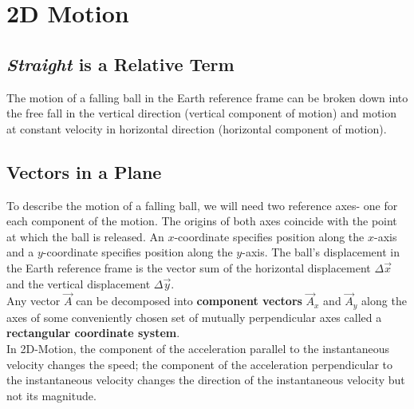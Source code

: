 \section{2D Motion}

    \subsection{\textit{Straight} is a Relative Term}

        The motion of a falling ball in the Earth reference frame can be broken down into the free fall in the vertical direction (vertical component of motion) and motion at constant velocity in horizontal direction
        (horizontal component of motion).


    \subsection{Vectors in a Plane}

        To describe the motion of a falling ball, we will need two reference axes- one for each component of the motion. The origins of both axes coincide with the point at which the ball is released. An $x$-coordinate
        specifies position along the $x$-axis and a $y$-coordinate specifies position along the $y$-axis. The ball's displacement in the Earth reference frame is the vector sum of the horizontal displacement
        $\Delta \vec{x}$ and the vertical displacement $\Delta \vec{y}$. \\

        Any vector $\vec{A}$ can be decomposed into \textbf{component vectors} $\vec{A}_x$ and $\vec{A}_y$ along the axes of some conveniently chosen set of mutually perpendicular axes called a
        \textbf{rectangular coordinate system}. \\

        In 2D-Motion, the component of the acceleration parallel to the instantaneous velocity changes the speed; the component of the acceleration perpendicular to the instantaneous velocity changes the direction of the
        instantaneous velocity but not its magnitude.

